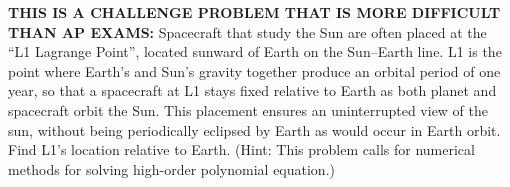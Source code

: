 \documentclass{../../oss-apphys-exam}
\begin{document}
\begin{questions}
  \newpage
  
  \question\textbf{THIS IS A CHALLENGE PROBLEM THAT IS MORE DIFFICULT THAN AP
    EXAMS:} Spacecraft that study the Sun are often placed at the ``L1 Lagrange
  Point'', located sunward of Earth on the Sun--Earth line. L1 is the point
  where Earth's and Sun's gravity together produce an orbital period of one
  year, so that a spacecraft at L1 stays fixed relative to Earth as both planet
  and spacecraft orbit the Sun. This placement ensures an uninterrupted view of
  the sun, without being periodically eclipsed by Earth as would occur in Earth
  orbit. Find L1's location relative to Earth. (Hint: This problem calls for
  numerical methods for solving high-order polynomial equation.)
\end{questions}
\end{document}
